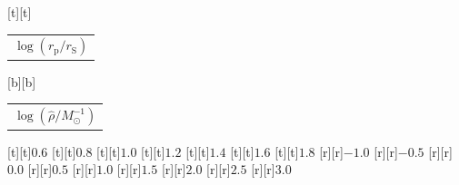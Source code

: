 %    
%
%
\begin{psfrags}%
\psfragscanon%
%
[t][t]{\color[rgb]{0,0,0}\setlength{\tabcolsep}{0pt}\begin{tabular}{c}{\Large$\log(r_\mathrm{p}/r_\mathrm{S})$}\end{tabular}}%
[b][b]{\color[rgb]{0,0,0}\setlength{\tabcolsep}{0pt}\begin{tabular}{c}{\Large$\log(\hat{\rho}/M_\odot^{-1})$}\end{tabular}}%
%
[t][t]{$0.6$}%
[t][t]{$0.8$}%
[t][t]{$1.0$}%
[t][t]{$1.2$}%
[t][t]{$1.4$}%
[t][t]{$1.6$}%
[t][t]{$1.8$}%
%
[r][r]{$-1.0$}%
[r][r]{$-0.5$}%
[r][r]{$0.0$}%
[r][r]{$0.5$}%
[r][r]{$1.0$}%
[r][r]{$1.5$}%
[r][r]{$2.0$}%
[r][r]{$2.5$}%
[r][r]{$3.0$}%
%
%
\end{psfrags}%
%
